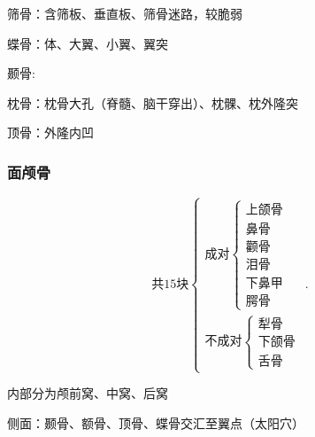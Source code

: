 \begin{notation}
    筛骨：含筛板、垂直板、筛骨迷路，较脆弱
\end{notation}

\begin{notation}
    蝶骨：体、大翼、小翼、翼突
\end{notation}

\begin{notation}
    颞骨:
\end{notation}

\begin{notation}
    枕骨：枕骨大孔（脊髓、脑干穿出）、枕髁、枕外隆突

    顶骨：外隆内凹
\end{notation}

\subsubsection{面颅骨}%
\label{subsub:面颅骨}
\[
    \mbox{共15块}
    \begin{cases}
        \mbox{成对}
        \begin{cases}
            \mbox{上颌骨}\\ 
            \mbox{鼻骨}\\ 
            \mbox{颧骨}\\ 
            \mbox{泪骨}\\ 
            \mbox{下鼻甲}\\ 
            \mbox{腭骨}
        \end{cases}\\
        \mbox{不成对}
        \begin{cases}
            \mbox{犁骨}\\ 
            \mbox{下颌骨}\\ 
            \mbox{舌骨}
        \end{cases}
    \end{cases}
.\] 

内部分为颅前窝、中窝、后窝

侧面：颞骨、额骨、顶骨、蝶骨交汇至翼点（太阳穴）
